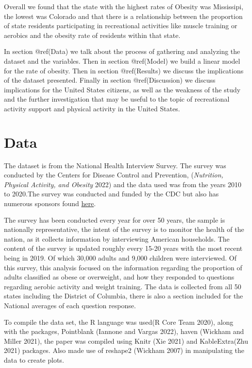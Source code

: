\documentclass[
]{article}
\begin{document}
Overall we found that the state with the highest rates of Obesity was
Mississipi, the lowest was Colorado and that there is a relationship
between the proportion of state residents participating in recreational
activities like muscle training or aerobics and the obesity rate of
residents within that state.

In section @ref(Data) we talk about the process of gathering and
analyzing the dataset and the variables. Then in section @ref(Model) we
build a linear model for the rate of obesity. Then in section
@ref(Results) we discuss the implications of the dataset presented.
Finally in section @ref(Discussion) we discuss implications for the
United States citizens, as well as the weakness of the study and the
further investigation that may be useful to the topic of recreational
activity support and physical activity in the United States.

\newpage

\hypertarget{Data}{%
\section{Data}\label{Data}}

The dataset is from the National Health Interview Survey. The survey was
conducted by the Centers for Disease Control and Prevention,
(\emph{Nutrition, Physical Activity, and Obesity} 2022) and the data
used was from the years 2010 to 2020.The survey was conducted and funded
by the CDC but also has numerous sponsors found
\href{https://www.cdc.gov/nchs/nhis/supplements_cosponsors.htm}{here}.

The survey has been conducted every year for over 50 years, the sample
is nationally representative, the intent of the survey is to monitor the
health of the nation, as it collects information by interviewing
American households. The content of the survey is updated roughly every
15-20 years with the most recent being in 2019. Of which 30,000 adults
and 9,000 children were interviewed. Of this survey, this analysis
focused on the information regarding the proportion of adults classified
as obese or overweight, and how they responded to questions regarding
aerobic activity and weight training. The data is collected from all 50
states including the District of Columbia, there is also a section
included for the National averages of each question response.

To compile the data set, the R language was used(R Core Team 2020),
along with the packages, Pointblank (Iannone and Vargas 2022), haven
(Wickham and Miller 2021), the paper was compiled using Knitr (Xie 2021)
and KableExtra(Zhu 2021) packages. Also made use of reshape2 (Wickham
2007) in manipulating the data to create plots.
\end{document}
